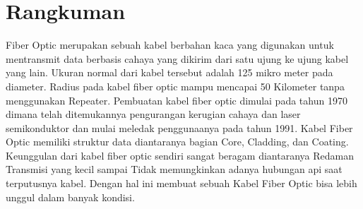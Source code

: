 \section{Rangkuman}
\begin{flushleft}
Fiber Optic merupakan sebuah kabel berbahan kaca yang digunakan untuk mentransmit data berbasis cahaya yang dikirim dari satu ujung ke ujung kabel yang lain. Ukuran normal dari kabel tersebut adalah 125 mikro meter pada diameter. Radius pada kabel fiber optic mampu mencapai 50 Kilometer tanpa menggunakan Repeater. Pembuatan kabel fiber optic dimulai pada tahun 1970 dimana telah ditemukannya pengurangan kerugian cahaya dan laser semikonduktor dan mulai meledak penggunaanya pada tahun 1991. Kabel Fiber Optic memiliki struktur data diantaranya bagian Core, Cladding, dan Coating. Keunggulan dari kabel fiber optic sendiri sangat beragam diantaranya Redaman Transmisi yang kecil sampai Tidak memungkinkan adanya hubungan api saat terputusnya kabel. Dengan hal ini membuat sebuah Kabel Fiber Optic bisa lebih unggul dalam banyak kondisi. 
\end{flushleft}
\cite{nilsson1992preterminated}
\cite{wahyudi2010mengenal}